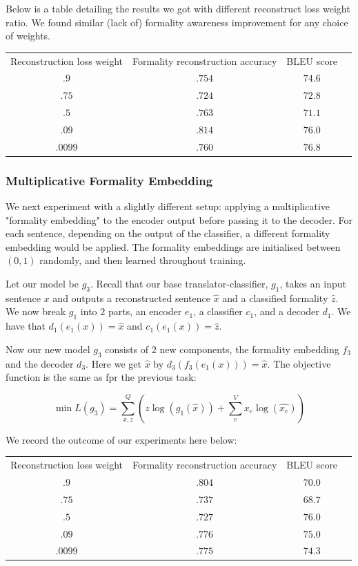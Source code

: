\documentclass[11pt]{article}
\begin{document}
Below is a table detailing the results we got with different reconstruct loss weight ratio. We found similar (lack of) formality awareness improvement for any choice of weights. 

\begin{tabular}{ c c c c }
    Reconstruction loss weight & Formality reconstruction accuracy & BLEU score \\
    $.9$ & $.754$ & $74.6$ \\
    $.75$ & $.724$ & $72.8$ \\
    $.5$ & $.763$ & $71.1$ \\
    $.09$ & $.814$ & $76.0$ \\
    $.0099$ & $.760$ & $76.8$ \\
\end{tabular}

\subsubsection{Multiplicative Formality Embedding}

We next experiment with a slightly different setup: applying a multiplicative "formality embedding" to the encoder output before passing it to the decoder. For each sentence, depending on the output of the classifier, a different formality embedding would be applied. The formality embeddings are initialised between $(0, 1)$ randomly, and then learned throughout training. 

Let our model be $g_3$. Recall that our base translator-classifier, $g_1$, takes an input sentence $x$ and outputs a reconstructed sentence $\hat{x}$ and a classified formality $\hat{z}$. We now break $g_1$ into $2$ parts, an encoder $e_1$, a classifier $c_1$, and a decoder $d_1$. We have that $d_1(e_1(x)) = \hat{x}$ and $c_1(e_1(x)) = \hat{z}$.

Now our new model $g_3$ consists of $2$ new components, the formality embedding $f_3$ and the decoder $d_3$. Here we get $\hat{x}$ by $d_3(f_3(e_1(x))) = \hat{x}$. The objective function is the same as fpr the previous task:

\begin{equation}
    \min{L(g_3)} = \sum_{x, z}^Q{(z \log{(g_1(\hat{x}))} + \sum_{e}^{V}{x_e \log{(\hat{x_e})}})}
\end{equation}

We record the outcome of our experiments here below:

\begin{tabular}{ c c c c }
    Reconstruction loss weight & Formality reconstruction accuracy & BLEU score \\
    $.9$ & $.804$ & $70.0$ \\
    $.75$ & $.737$ & $68.7$ \\
    $.5$ & $.727$ & $76.0$ \\
    $.09$ & $.776$ & $75.0$ \\
    $.0099$ & $.775$ & $74.3$ \\
\end{tabular}
\end{document}
